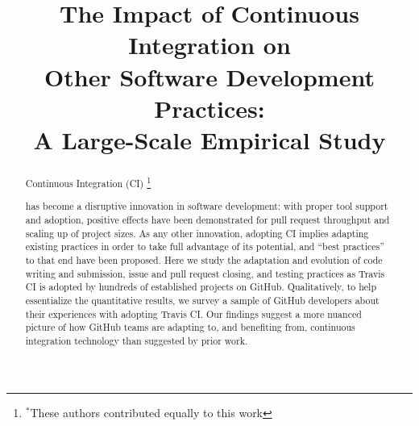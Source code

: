 \documentclass[conference]{IEEEtran}
\newcommand{\GH}{{\sc GitHub}\xspace}
\newcommand{\Tvis}{{\sc Travis CI}\xspace}
\newcommand\blfootnote[1]{%
  \begingroup
  \renewcommand\thefootnote{}\footnote{#1}%
  \addtocounter{footnote}{-1}%
  \endgroup
}
\begin{document}
\title{The Impact of Continuous Integration on \\Other Software 
Development Practices: \\A Large-Scale Empirical Study}


\author{
\and
{}
\and
{}
\and
{}
\and
{}
}


\maketitle

\begin{abstract}
Continuous Integration (CI)\blfootnote{$^*$These authors contributed equally to this work} 
has become a disruptive innovation in software development: with proper 
tool support and adoption, positive effects have been demonstrated for pull 
request throughput and scaling up of project sizes. 
As any other innovation, adopting CI implies adapting existing practices in 
order to take full advantage of its potential, and ``best practices'' to that end 
have been proposed. 
Here we study the adaptation and evolution of code writing and submission,
issue and pull request closing, and testing practices as \Tvis is adopted by 
hundreds of established projects on \GH. 
Qualitatively, to help essentialize the quantitative results, we survey a 
sample of \GH developers about their experiences with adopting \Tvis. 
Our findings suggest a more nuanced picture of how \GH teams are adapting to, and
benefiting from, continuous integration technology than suggested by prior
work.
\end{abstract}
\end{document}
